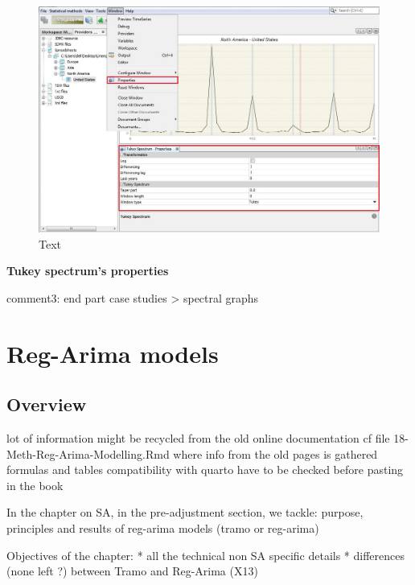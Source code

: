 \documentclass[
  letterpaper,
  DIV=11,
  numbers=noendperiod]{scrreprt}
\begin{document}
\begin{enumerate}
  \begin{figure}

  {\centering \includegraphics{./All_images/image10_342.jpeg}

  }

  \caption{Text}

  \end{figure}

  \textbf{Tukey spectrum's properties}
\end{enumerate}

comment3: end part case studies \textgreater{} spectral graphs

\hypertarget{reg-arima-models}{%
\chapter{Reg-Arima models}\label{reg-arima-models}}

\hypertarget{overview-1}{%
\section{Overview}\label{overview-1}}

lot of information might be recycled from the old online documentation
cf file 18-Meth-Reg-Arima-Modelling.Rmd where info from the old pages is
gathered formulas and tables compatibility with quarto have to be
checked before pasting in the book

In the chapter on SA, in the pre-adjustment section, we tackle: purpose,
principles and results of reg-arima models (tramo or reg-arima)

Objectives of the chapter: * all the technical non SA specific details *
differences (none left ?) between Tramo and Reg-Arima (X13)
\end{document}

